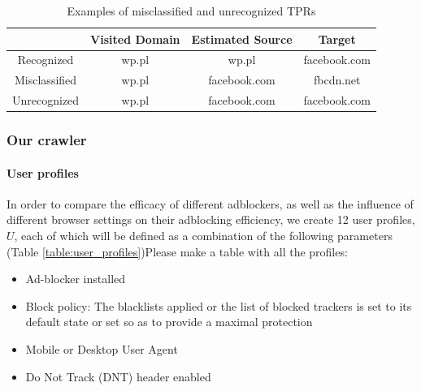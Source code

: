 \documentclass{sig-alternate}
\begin{document}
\begin{table}
\centering
\small
\begin{tabular}{|c|c c c|}
\hline
& Visited Domain & Estimated Source & Target \\
\hline
Recognized & wp.pl & wp.pl & facebook.com \\
Misclassified & wp.pl & facebook.com & fbcdn.net \\
Unrecognized & wp.pl & facebook.com & facebook.com \\
\hline
\end{tabular}
\caption{Examples of misclassified and unrecognized TPRs}
\label{table:false_positive_examples}
\end{table}

\subsubsection{Our crawler}
\paragraph{User profiles}
\label{sec:user_profiles}
In order to compare the efficacy of different adblockers, as well as the influence of different browser settings on their adblocking efficiency, we create 12 user profiles, $U$, each of which will be defined as a combination of the following parameters (Table \ref{table:user_profiles}){\color{red}Please make a table with all the profiles}:

\begin{itemize}
 \item Ad-blocker installed
 \item Block policy: The blacklists applied or the list of blocked trackers is set to its default state or set so as to provide a maximal protection
 \item Mobile or Desktop User Agent
 \item Do Not Track (DNT) header enabled
\end{itemize}
\end{document}
